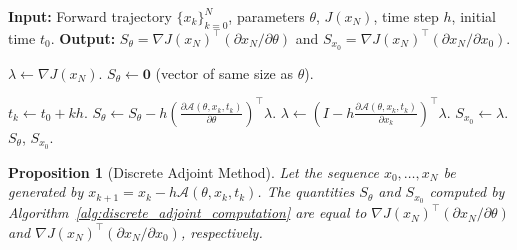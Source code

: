 \documentclass{article}
\newcommand{\Acal}{\mathcal{A}}
\newtheorem{proposition}{Proposition}
\begin{document}
\begin{algorithm}
\caption{Discrete Adjoint Method for Sensitivity Components}
\label{alg:discrete_adjoint_computation}
\begin{algorithmic}[1]
\State \textbf{Input:} Forward trajectory $\{x_k\}_{k=0}^N$, parameters $\theta$, $J(x_N)$, time step $h$, initial time $t_0$.
\State \textbf{Output:} $S_{\theta} = \nabla J(x_N)^\top (\partial x_N / \partial \theta)$ and $S_{x_0} = \nabla J(x_N)^\top (\partial x_N / \partial x_0)$.

\State $\lambda \gets \nabla J(x_N)$.  
\State $S_{\theta} \gets \bm{0}$ (vector of same size as $\theta$). 

    \State $t_k \gets t_0 + kh$.
    \State $S_{\theta} \gets S_{\theta} - h \left(\frac{\partial \Acal(\theta, x_k, t_k)}{\partial \theta}\right)^\top \lambda$. 
    \State $\lambda \gets \left(I - h \frac{\partial \Acal(\theta, x_k, t_k)}{\partial x_k}\right)^\top \lambda$. 
\EndFor
\State $S_{x_0} \gets \lambda$. 
\State \Return $S_{\theta}$, $S_{x_0}$.
\end{algorithmic}
\end{algorithm}



\begin{proposition}[Discrete Adjoint Method]
\label{thm:adjoint_correctness}
Let the sequence $x_0, \dots, x_N$ be generated by $x_{k+1} = x_k - h\Acal(\theta, x_k, t_k)$.
The quantities $S_{\theta}$ and $S_{x_0}$ computed by Algorithm~\ref{alg:discrete_adjoint_computation} are equal to $\nabla J(x_N)^\top (\partial x_N / \partial \theta)$ and $\nabla J(x_N)^\top (\partial x_N / \partial x_0)$, respectively.
\end{proposition}
\end{document}
